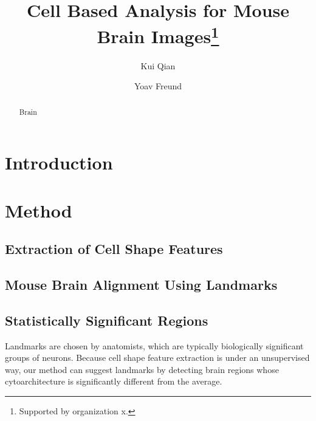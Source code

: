 \documentclass[runningheads]{llncs}
\begin{document}
%
\title{Cell Based Analysis for Mouse Brain Images\thanks{Supported by organization x.}}
%
%
\author{Kui Qian \and
Yoav Freund }
%
%
%
\maketitle              %
%
\begin{abstract}
Brain 

\end{abstract}
%
%
%
\section{Introduction}


\section{Method}
\subsection{Extraction of Cell Shape Features}


\subsection{Mouse Brain Alignment Using Landmarks}


\subsection{Statistically Significant Regions}

Landmarks are chosen by anatomists, which are typically biologically significant groups of neurons. Because cell shape feature extraction is under an unsupervised way, our method can suggest landmarks by detecting brain regions whose cytoarchitecture is significantly different from the average.
\end{document}
